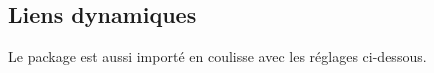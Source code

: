 

\usepackage{../macroenv/macroenv}
\usepackage{../listing/listing}
\usepackage{../inenglish/inenglish}


\usepackage[lang = FR]{main}





\subsection{Liens dynamiques}

Le package  est aussi importé en coulisse avec les réglages ci-dessous.

\begin{bdoclatex-alone}
\hypersetup{
    colorlinks,
    citecolor = orange!75!black,
    filecolor = orange!75!black,
    linkcolor = orange!75!black,
    urlcolor  = orange!75!black
}
\end{bdoclatex-alone}



